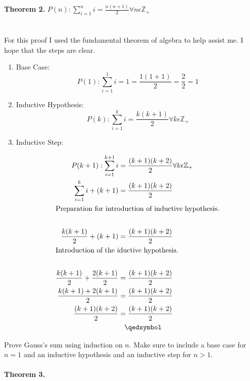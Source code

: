 \documentclass[12pt]{article}
\begin{document}
\noindent \textbf{Theorem 2.}
\begin{math}P(n):\sum\limits_{i = 1}^{n} i = \frac{n(n + 1)}{2} \forall n \epsilon \mathbb{Z}_+  \end{math}\\
\\\\For this proof I used the fundamental theorem of algebra to help assist me. I hope that the steps are clear.\\
\begin{enumerate}
\item Base Case:\\
\[P(1):\sum\limits_{i = 1}^{1} i = 1  = \frac{1(1+1)}{2} = \frac{2}{2} = 1\]
\item Inductive Hypothesis:
\[P(k):\sum\limits_{i = 1}^{k} i = \frac{k(k + 1)}{2} \forall k \epsilon \mathbb{Z}_+\]
\item Inductive Step:

\begin{align*}
P(k+1):\sum\limits_{i = 1}^{k+1} i &= \frac{(k + 1)(k+2)}{2} \forall k \epsilon \mathbb{Z}_+\\
\sum\limits_{i = 1}^{k} i + (k + 1)&= \frac{(k + 1)(k+2)}{2}\\
\intertext{Preparation for introduction of inductive hypothesis.}\\
\frac{k(k+1)}{2} + (k+1)&= \frac{(k + 1)(k+2)}{2}\\
\intertext{Introduction of the iductive hypothesis.}\\
\frac{k(k+1)}{2} + \frac{2(k+1)}{2}&= \frac{(k + 1)(k+2)}{2}\\
\frac{k(k+1)+ 2(k+1)}{2}&= \frac{(k + 1)(k+2)}{2}\\
\frac{(k + 1)(k+2)}{2}&= \frac{(k + 1)(k+2)}{2}\\
&\hspace{0.3cm}\qedsymbol
\end{align*}
\end{enumerate}
\noindent Prove Gauss’s sum using induction on \begin{math}n\end{math}. Make sure to include a base case for \begin{math} n = 1\end{math} and an inductive hypothesis and an inductive step for \begin{math}n > 1\end{math}.\\\\
\noindent \textbf{Theorem 3.}
\end{document}
